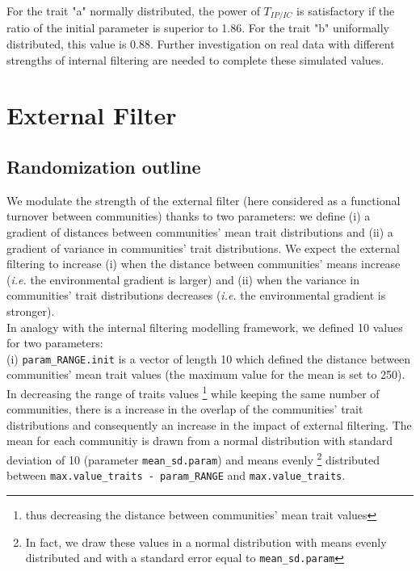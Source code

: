 \documentclass[12pt]{article}\usepackage[]{graphicx}\usepackage[]{color}
\begin{document}
For the trait "a" normally distributed, the power of $T_{IP/IC}$ is satisfactory if the ratio of the initial parameter is superior to
 1.86. For the trait "b" uniformally distributed, this value is 0.88. 
 Further investigation on real data with different strengths of internal filtering are needed to complete these simulated values.

 

























\cleardoublepage

\section{External Filter}

 \subsection {Randomization outline}
 
We modulate the strength of the external filter (here considered as a functional turnover between communities) thanks to two parameters:
we define (i) a gradient of distances between communities' mean trait distributions and (ii) a gradient of variance in communities' trait distributions. We expect the external filtering to increase (i) when the distance between communities' means increase (\textit{i.e.} the environmental gradient is larger) and (ii) when the variance in communities' trait distributions decreases (\textit{i.e.} the environmental gradient is stronger).
\\

In analogy with the internal filtering modelling framework, we defined 10 values for two parameters:
\\

 (i) \texttt{param\_{}RANGE.init} is a vector of length 10 which defined the distance between communities' mean trait values (the maximum value for the mean is set to 250). In decreasing the range of traits values \footnote{thus decreasing the distance between communities' mean trait values} while keeping the same number of communities, there is a increase in the overlap of the communities' trait distributions and consequently an increase in the impact of external filtering. The mean for each communitiy is drawn from a normal distribution with standard deviation of 10 (parameter \texttt{mean\_{}sd.param}) and means evenly
\footnote{In fact, we draw these values in a normal distribution with means evenly distributed and with a standard error equal to \texttt{mean\_{}sd.param}} distributed between \texttt{max.value\_{}traits - param\_{}RANGE} and \texttt{max.value\_{}traits}.
\\
\end{document}
